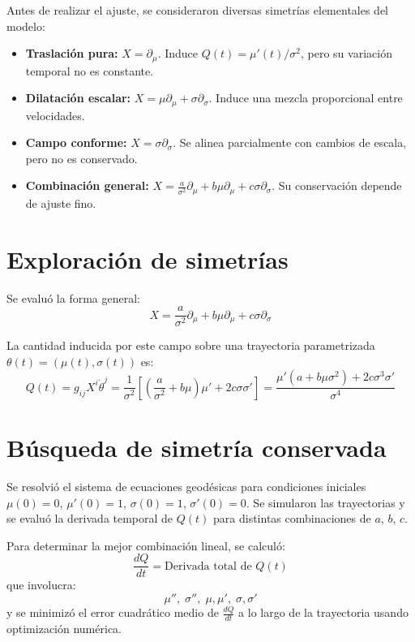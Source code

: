 \documentclass[11pt]{article}
\begin{document}
	Antes de realizar el ajuste, se consideraron diversas simetr\'ias elementales del modelo:
	\begin{itemize}
		\item \textbf{Traslaci\'on pura:} $X = \partial_\mu$. Induce $Q(t) = \mu'(t)/\sigma^2$, pero su variaci\'on temporal no es constante.
		\item \textbf{Dilataci\'on escalar:} $X = \mu \partial_\mu + \sigma \partial_\sigma$. Induce una mezcla proporcional entre velocidades.
		\item \textbf{Campo conforme:} $X = \sigma \partial_\sigma$. Se alinea parcialmente con cambios de escala, pero no es conservado.
		\item \textbf{Combinaci\'on general:} $X = \frac{a}{\sigma^2} \partial_\mu + b \mu \partial_\mu + c \sigma \partial_\sigma$. Su conservaci\'on depende de ajuste fino.
	\end{itemize}
	
	\section{Exploraci\'on de simetr\'ias}
	
	Se evalu\'o la forma general:
	\[
	X = \frac{a}{\sigma^2} \partial_\mu + b \mu \partial_\mu + c \sigma \partial_\sigma
	\]
	
	La cantidad inducida por este campo sobre una trayectoria parametrizada $\theta(t) = (\mu(t), \sigma(t))$ es:
	\[
	Q(t) = g_{ij} X^i \dot{\theta}^j = \frac{1}{\sigma^2} \left[ \left(\frac{a}{\sigma^2} + b\mu\right)\mu' + 2c\sigma\sigma' \right] = \frac{\mu'(a + b\mu\sigma^2) + 2c\sigma^3\sigma'}{\sigma^4}
	\]
	
	\section{B\'usqueda de simetr\'ia conservada}
	
	Se resolvi\'o el sistema de ecuaciones geod\'esicas para condiciones iniciales $\mu(0) = 0$, $\mu'(0) = 1$, $\sigma(0) = 1$, $\sigma'(0) = 0$. Se simularon las trayectorias y se evalu\'o la derivada temporal de $Q(t)$ para distintas combinaciones de $a$, $b$, $c$.
	
	Para determinar la mejor combinaci\'on lineal, se calcul\'o:
	\[
	\frac{dQ}{dt} = \text{Derivada total de } Q(t)
	\]
	que involucra:
	\[
	\mu'', \; \sigma'', \; \mu, \mu', \; \sigma, \sigma'
	\]
	y se minimiz\'o el error cuadr\'atico medio de $\frac{dQ}{dt}$ a lo largo de la trayectoria usando optimizaci\'on num\'erica.
	
\end{document}
